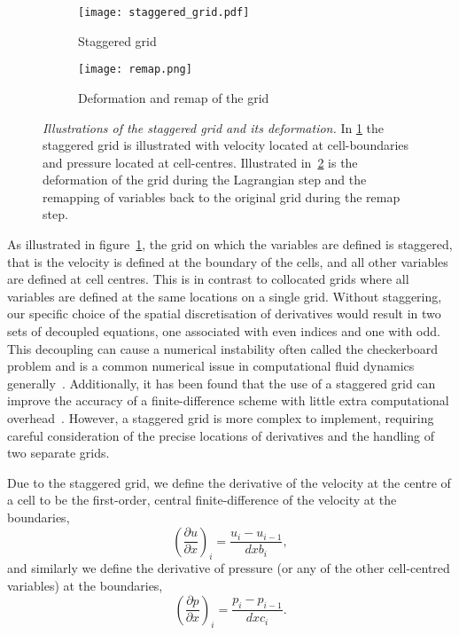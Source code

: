 \begin{figure}[t]
    \hfill
    \begin{subfigure}{0.3\textwidth}
      \centering
      \texttt{[image: staggered\_grid.pdf]}
      \caption{Staggered grid}%
      \label{fig:staggered_grid}
    \end{subfigure}
    \hfill
    \begin{subfigure}{0.49\textwidth}
      \texttt{[image: remap.png]}
      \caption{Deformation and remap of the grid}%
      \label{fig:remap}
    \end{subfigure}
    \caption{\emph{Illustrations of the staggered grid and its deformation.} In \ref{fig:staggered_grid} the staggered grid is illustrated with velocity located at cell-boundaries and pressure located at cell-centres. Illustrated in~\ref{fig:remap} is the deformation of the grid during the Lagrangian step and the remapping of variables back to the original grid during the remap step.}
\label{fig:grid_and_remap}%
\end{figure}

As illustrated in figure~\ref{fig:staggered_grid}, the grid on which the variables are defined is staggered, that is the velocity is defined at the boundary of the cells, and all other variables are defined at cell centres. This is in contrast to collocated grids where all variables are defined at the same locations on a single grid. Without staggering, our specific choice of the spatial discretisation of derivatives would result in two sets of decoupled equations, one associated with even indices and one with odd. This decoupling can cause a numerical instability often called the checkerboard problem and is a common numerical issue in computational fluid dynamics generally~\cite{ferzigerComputationalMethodsFluid2002}. Additionally, it has been found that the use of a staggered grid can improve the accuracy of a finite-difference scheme with little extra computational overhead~\cite{rojanaratanangkulePerformanceHighOrder2015}. However, a staggered grid is more complex to implement, requiring careful consideration of the precise locations of derivatives and the handling of two separate grids. 

Due to the staggered grid, we define the derivative of the velocity at the centre of a cell to be the first-order, central finite-difference of the velocity at the boundaries,
\begin{equation}
  {\left( \frac{\partial u}{\partial x} \right)}_i = \frac{u_i - u_{i-1}}{dxb_i},
  \label{}
\end{equation}
and similarly we define the derivative of pressure (or any of the other cell-centred variables) at the boundaries,
\begin{equation}
  {\left( \frac{\partial p}{\partial x} \right)}_i = \frac{p_i - p_{i-1}}{dxc_i}.
  \label{}
\end{equation}

